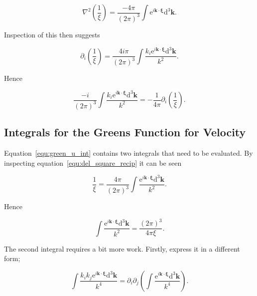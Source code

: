 \documentclass[12pt]{article}
\begin{document}
\begin{equation}
\label{equ:del_square_recip}
\nabla^{2} \left(\frac{1}{\xi}\right) = \frac{-4 \pi}{(2 \pi)^{3}} \int \mathrm{e}^{i \boldsymbol{k} \cdot \boldsymbol{\xi}} \mathrm{d}^{3} \boldsymbol{k} .
\end{equation}

Inspection of this then suggests

\begin{equation}
\label{equ:grad_recip}
\partial_{i} \left(\frac{1}{\xi}\right) = \frac{4 i \pi}{(2 \pi)^{3}} \int \frac{ k_{i} \mathrm{e}^{i \boldsymbol{k} \cdot \boldsymbol{\xi}} \mathrm{d}^{3} \boldsymbol{k}}{k^{2}} .
\end{equation}

Hence

\begin{equation}
\label{equ:green_p_ident}
\frac{-i}{(2 \pi)^{3}} \int \frac{ k_{i} \mathrm{e}^{i \boldsymbol{k} \cdot \boldsymbol{\xi}} \mathrm{d}^{3} \boldsymbol{k}}{k^{2}} = -\frac{1}{4 \pi} \partial_{i} \left(\frac{1}{\xi}\right) .
\end{equation}

\subsection{Integrals for the Greens Function for Velocity}
\label{sub_app:green_vel}

Equation~\ref{equ:green_u_int} contains two integrals that need to be evaluated. By inspecting equation~\ref{equ:del_square_recip} it can be seen

\begin{equation}
\label{equ:recip_int}
\frac{1}{\xi} = \frac{4 \pi}{(2 \pi)^{3}} \int \frac{\mathrm{e}^{i \boldsymbol{k} \cdot \boldsymbol{\xi}} \mathrm{d}^{3} \boldsymbol{k}}{k^{2}} .
\end{equation}

Hence

\begin{equation}
\label{equ:green_u_int1}
\int \frac{\mathrm{e}^{i \boldsymbol{k} \cdot \boldsymbol{\xi}} \mathrm{d}^{3} \boldsymbol{k}}{k^{2}} = \frac{(2 \pi)^{3}}{4 \pi \xi} .
\end{equation}

The second integral requires a bit more work. Firstly, express it in a different form;

\begin{equation}
\label{equ:green_u_int2_new}
\int \frac{k_{i} k_{j} \mathrm{e}^{i \boldsymbol{k} \cdot \boldsymbol{\xi}} \mathrm{d}^{3} \boldsymbol{k}}{k^{4}} = \partial_{i} \partial_{j} \left(\int \frac{\mathrm{e}^{i \boldsymbol{k} \cdot \boldsymbol{\xi}} \mathrm{d}^{3} \boldsymbol{k}}{k^{4}} \right) .
\end{equation}
\end{document}
